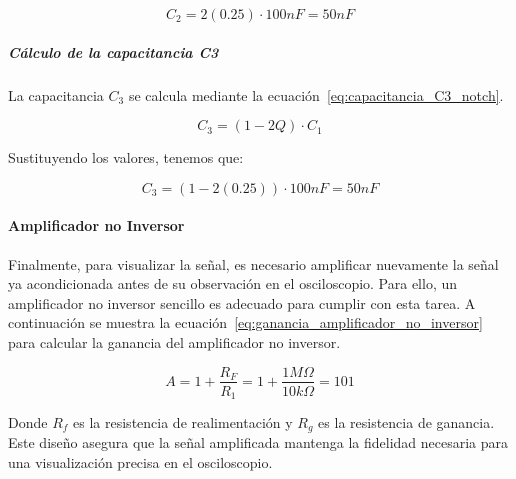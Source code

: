                     \begin{equation}
                        C_2 = 2(0.25) \cdot 100 nF = 50 nF
                    \end{equation}

                \subparagraph{Cálculo de la capacitancia C3}
                    La capacitancia $C_3$ se calcula mediante la ecuación~\ref{eq:capacitancia_C3_notch}.

                    \begin{equation}
                        \label{eq:capacitancia_C3_notch}
                        C_3 = (1 - 2Q) \cdot C_1
                    \end{equation}

                    Sustituyendo los valores, tenemos que:

                    \begin{equation}
                        C_3 = (1 - 2(0.25)) \cdot 100 nF = 50 nF
                    \end{equation}

            \paragraph{Amplificador no Inversor}
                Finalmente, para visualizar la señal, es necesario amplificar nuevamente la señal ya acondicionada antes de su observación en el osciloscopio. Para ello, un amplificador no inversor sencillo es adecuado para cumplir con esta tarea. A continuación se muestra la ecuación~\ref{eq:ganancia_amplificador_no_inversor} para calcular la ganancia del amplificador no inversor.

                \begin{equation}
                    \label{eq:ganancia_amplificador_no_inversor}
                    A = 1 + \frac{R_F}{R_{1}} = 1 + \frac{1 M\Omega}{10 k\Omega} = 101
                \end{equation}

                Donde $R_f$ es la resistencia de realimentación y $R_g$ es la resistencia de ganancia. Este diseño asegura que la señal amplificada mantenga la fidelidad necesaria para una visualización precisa en el osciloscopio.